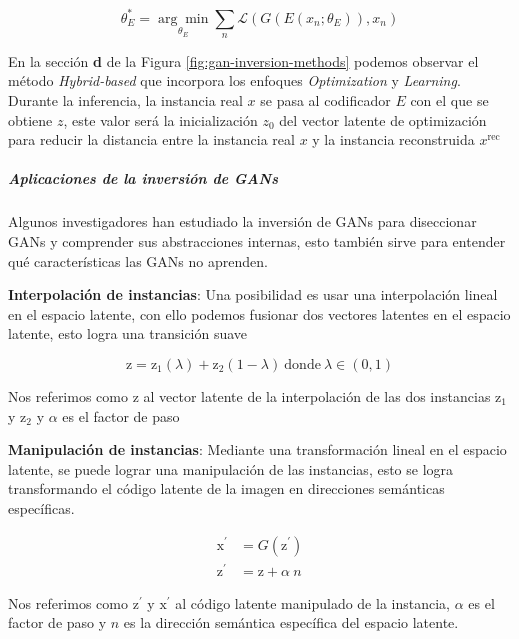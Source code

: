 \begin{equation}
    {\theta}_{E}^{*} = \underset{\theta_{E}}{\arg\min} \sum_{n}{ \mathcal{L}(G(E(x_{n};\theta_{E})),x_{n})  }
    \label{eq:GAN-inversion--learning-based}
\end{equation}

En la sección \textbf{d} de la Figura \ref{fig:gan-inversion-methods} podemos observar el método \textit{Hybrid-based} que incorpora los enfoques \textit{Optimization} y \textit{Learning}. Durante la inferencia, la instancia real ${x}$ se pasa al codificador ${E}$ con el que se obtiene ${z}$, este valor será la inicialización ${z_{0}}$ del vector latente de optimización para reducir la distancia entre la instancia real ${x}$ y la instancia reconstruida ${x^{\text{rec}}}$

\subparagraph{Aplicaciones de la inversión de GANs}

Algunos investigadores han estudiado la inversión de GANs para diseccionar GANs y comprender sus abstracciones internas, esto también sirve para entender qué características las GANs no aprenden.

\textbf{Interpolación de instancias}:
Una posibilidad es usar una interpolación lineal en el espacio latente, con ello podemos fusionar dos vectores latentes en el espacio latente, esto logra una transición suave

\begin{equation}
    \mathrm{z} = \mathrm{z}_{1}(\lambda) + \mathrm{z}_{2}(1 - \lambda) ~\text{donde}~ \lambda \in (0,1)
\end{equation}

Nos referimos como ${\mathrm{z}}$ al vector latente de la interpolación de las dos instancias ${\mathrm{z}_{1}}$ y ${\mathrm{z}_{2}}$ y ${\alpha}$ es el factor de paso

\textbf{Manipulación de instancias}:
Mediante una transformación lineal en el espacio latente, se puede lograr una manipulación de las instancias, esto se logra transformando el código latente de la imagen en direcciones semánticas específicas.

\begin{equation}
    \begin{split}
        \mathrm{x}^{\prime} &= G(\mathrm{z}^{\prime}) \\
        \mathrm{z}^{\prime} &= \mathrm{z} + \alpha ~n
    \end{split}
\end{equation}

Nos referimos como ${\mathrm{z}^{\prime}}$ y ${\mathrm{x}^{\prime}}$ al código latente manipulado de la instancia, ${\alpha}$ es el factor de paso y ${n}$ es la dirección semántica específica del espacio latente.

